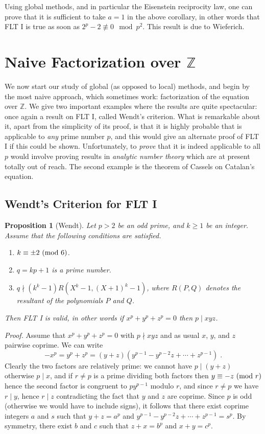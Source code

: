 \documentclass[12pt,a4paper]{article}
\newcommand{\Z}{{\mathbb Z}}
\newcommand{\Proof}{{\it Proof. \/}}
\newtheorem{proposition}[theorem]{Proposition}
\renewcommand{\pmod}[1]{\allowbreak\ ({\rm{mod}}\,\,#1)}
\begin{document}
\smallskip

Using global methods, and in particular the Eisenstein reciprocity law,
one can prove that it is sufficient to take $a=1$ in the above corollary, in 
other words that FLT I is true as soon as $2^p-2\not\equiv0\mod{p^2}$. This
result is due to Wieferich.

\section{Naive Factorization over $\Z$}

We now start our study of global (as opposed to local) methods, and begin
by the most naive approach, which sometimes work: factorization of the
equation over $\Z$. We give two important examples where the results are
quite spectacular: once again a result on FLT I, called Wendt's criterion.
What is remarkable about it, apart from the simplicity of its proof, is that
it is highly probable that is applicable to \emph{any} prime number $p$,
and this would give an alternate proof of FLT I if this could be shown. 
Unfortunately, to \emph{prove} that it is indeed applicable to all $p$ would
involve proving results in \emph{analytic number theory} which are at present
totally out of reach. The second example is the theorem of Cassels on Catalan's
equation.

\subsection{Wendt's Criterion for FLT I}

\begin{proposition}[Wendt]\label{wendt} Let $p>2$ be an odd prime, and 
$k\ge1$ be an integer. Assume that the following conditions are satisfied.
\begin{enumerate}\item $k\equiv\pm2\pmod{6}$.
\item $q=kp+1$ is a prime number.
\item $q\nmid(k^k-1)R(X^k-1,(X+1)^k-1)$, where $R(P,Q)$ denotes the resultant
of the polynomials $P$ and $Q$.
\end{enumerate}
Then FLT I is valid, in other words if $x^p+y^p+z^p=0$ then $p\mid xyz$.
\end{proposition}

\Proof Assume that $x^p+y^p+z^p=0$ with $p\nmid xyz$ and as usual $x$, $y$,
and $z$ pairwise coprime. We can write
$$-x^p=y^p+z^p=(y+z)(y^{p-1}-y^{p-2}z+\cdots+z^{p-1})\;.$$
Clearly the two factors are relatively prime: we cannot have $p\mid (y+z)$
otherwise $p\mid x$, and if $r\neq p$ is a prime dividing both factors
then $y\equiv -z\pmod{r}$ hence the second factor is congruent to
$py^{p-1}$ modulo $r$, and since $r\neq p$ we have $r\mid y$, hence $r\mid z$
contradicting the fact that $y$ and $z$ are coprime. Since $p$ is odd 
(otherwise we would have to include signs), it follows that there 
exist coprime integers $a$ and $s$ such that $y+z=a^p$ and 
$y^{p-1}-y^{p-2}z+\cdots+z^{p-1}=s^p$. By symmetry, there exist $b$ and $c$
such that $z+x=b^p$ and $x+y=c^p$.
\end{document}
